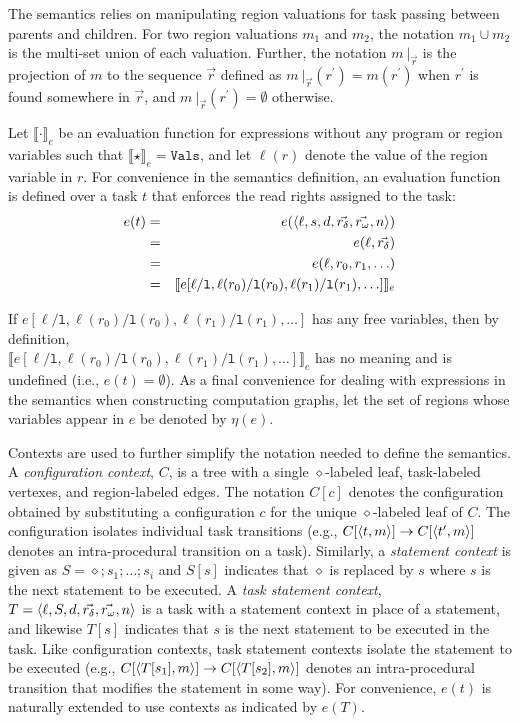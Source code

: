 The semantics relies on manipulating region valuations for task passing between parents and children. For two region valuations $m_1$ and $m_2$, the notation $m_1 \cup m_2$ is the multi-set union of each valuation. Further, the notation $m\ |_{\vec{r}}$ is the projection of $m$ to the sequence $\vec{r}$ defined as $m\ |_{\vec{r}}(r^\prime) = m(r^\prime)$  when $r^\prime$ is found somewhere in $\vec{r}$, and $m\ |_{\vec{r}}(r^\prime) = \emptyset$ otherwise. 

Let $\llbracket \cdot \rrbracket_e$ be an evaluation function for expressions without any program or region variables such that $\llbracket \star \rrbracket_e = \texttt{Vals}$, and let $\ell(r)$ denote the value of the region variable in $r$.  For convenience in the semantics definition, an evaluation function is defined over a task $t$ that enforces the read rights assigned to the task:
\begin{eqnarray*}
  e(t) &=& e(\langle \ell, s, d, \vec{r_\delta}, \vec{r_\omega}, n \rangle ) \\
  &=& e(\ell, \vec{r_\delta}) \\
  &=& e(\ell, r_0, r_1, \ldots) \\
  &=& \llbracket e[\ell / \texttt{l},\ell(r_0) / \texttt{l}(r_0), \ell(r_1) / \texttt{l}(r_1), \ldots]  \rrbracket_e
  \end{eqnarray*}
  
If $e[\ell / \texttt{l},\ell(r_0) / \texttt{l}(r_0), \ell(r_1) / \texttt{l}(r_1), \ldots]$ has any free variables, then by definition,\\
$\llbracket e[\ell / \texttt{l},\ell(r_0) / \texttt{l}(r_0), \ell(r_1) / \texttt{l}(r_1), \ldots]  \rrbracket_e$ has no meaning and is undefined (i.e., $e(t) = \emptyset$). As a final convenience for dealing with expressions in the semantics when constructing computation graphs, let the set of regions whose variables appear in $e$ be denoted by $\eta(e)$. 

Contexts are used to further simplify the notation needed to define the semantics.  A \emph{configuration context}, $C$, is a tree with a single $\diamond$-labeled leaf, task-labeled vertexes, and region-labeled edges. The notation $C[c]$ denotes the configuration obtained by substituting a configuration $c$ for the unique $\diamond$-labeled leaf of $C$. The configuration isolates individual task transitions (e.g., $C[\langle t,m \rangle ] \rightarrow C[\langle t^\prime,m \rangle ]$ denotes an intra-procedural transition on a task). Similarly, a \emph{statement context} is given as $S = \diamond ; s_1; \dots ;s_i$ and $S[s]$ indicates that $\diamond$ is replaced by $s$ where $s$ is the next statement to be executed. A \emph{task statement context}, $T = \langle \ell,  S, d, \vec{r_\delta}, \vec{r_\omega}, n \rangle $ is a task with a statement context in place of a statement, and likewise $T[s]$ indicates that $s$ is the next statement to be executed in the task. Like configuration contexts, task statement contexts isolate the statement to be executed (e.g., $C[\langle T[s_1],m \rangle ] \rightarrow C[\langle T[s_2],m \rangle ]$ denotes an intra-procedural transition that modifies the statement in some way). For convenience, $e(t)$ is naturally extended to use contexts as indicated by $e(T)$. 

